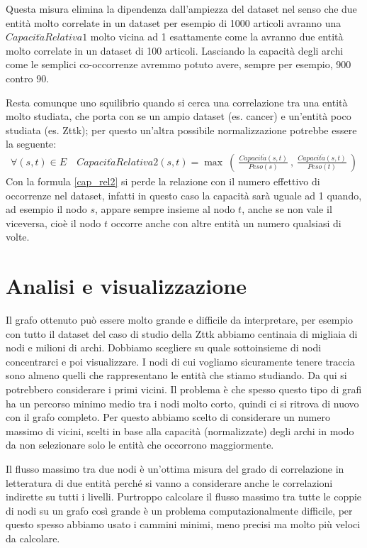 \documentclass[12pt]{report}
\begin{document}
Questa misura elimina la dipendenza dall'ampiezza del dataset nel senso che due entità molto correlate in un dataset per esempio di 1000 articoli avranno una $Capacit\grave{a}Relativa1$ molto vicina ad 1 esattamente come la avranno due entità molto correlate in un dataset di 100 articoli. Lasciando la capacità degli archi come le semplici co-occorrenze avremmo potuto avere, sempre per esempio, 900 contro 90.

Resta comunque uno squilibrio quando si cerca una correlazione tra una entità molto studiata, che porta con se un ampio dataset (es. cancer) e un'entità poco studiata (es. Zttk); per questo un'altra possibile normalizzazione potrebbe essere la seguente:
\begin{gather}
    \label{cap_rel2}\forall (s, t) \in E \quad Capacit\grave{a}Relativa2(s, t) = \max\ (\  \frac{Capacit\grave{a}(s, t)}{Peso(s)}\ ,\ \frac{Capacit\grave{a}(s, t)}{Peso(t)}\ )
\end{gather}
Con la formula \ref{cap_rel2} si perde la relazione con il numero effettivo di occorrenze nel dataset, infatti in questo caso la capacità sarà uguale ad 1 quando, ad esempio il nodo $s$, appare sempre insieme al nodo $t$, anche se non vale il viceversa, cioè il nodo $t$ occorre anche con altre entità un numero qualsiasi di volte.

\section{Analisi e visualizzazione}

Il grafo ottenuto può essere molto grande e difficile da interpretare, per esempio con tutto il dataset del caso di studio della Zttk abbiamo centinaia di migliaia di nodi e milioni di archi. Dobbiamo scegliere su quale sottoinsieme di nodi concentrarci e poi visualizzare. I nodi di cui vogliamo sicuramente tenere traccia sono almeno quelli che rappresentano le entità che stiamo studiando. Da qui si potrebbero considerare i primi vicini. Il problema è che spesso questo tipo di grafi ha un percorso minimo medio tra i nodi molto corto, quindi ci si ritrova di nuovo con il grafo completo. Per questo abbiamo scelto di considerare un numero massimo di vicini, scelti in base alla capacità (normalizzate) degli archi in modo da non selezionare solo le entità che occorrono maggiormente. 

Il flusso massimo tra due nodi è un'ottima misura del grado di correlazione in letteratura di due entità perché si vanno a considerare anche le correlazioni indirette su tutti i livelli. Purtroppo calcolare il flusso massimo tra tutte le coppie di nodi su un grafo così grande è un problema computazionalmente difficile, per questo spesso abbiamo usato i cammini minimi, meno precisi ma molto più veloci da calcolare.
\end{document}

